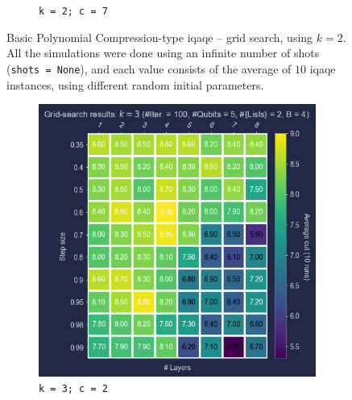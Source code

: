 \begin{figure}[ht!]
\begin{subfigure}[b]{0.325\textwidth}
      \caption{\texttt{k = 2; c = 7}}
      \label{fig:k=2;c=7}
  \end{subfigure}
  \caption{Basic Polynomial Compression-type \acrshort{iqaqe} – grid search, using $k=2$. All the simulations were done using an infinite number of shots (\texttt{shots = None}), and each value consists of the average of $10$ \acrshort{iqaqe} instances, using different random initial parameters.}
  \label{fig:k=2}
\end{figure}

\begin{figure}[ht!]
  \centering
  \begin{subfigure}[b]{0.475\textwidth}
      \centering
      \includegraphics[width=1\textwidth]{Figures/Chapter_5/k=3(Grid_search)/iQAQE_k3_Grid_Search_step_size_n_layers_c=2.png}
      \caption{\texttt{k = 3; c = 2}}
      \label{fig:k=3;c=2}
  \end{subfigure}
  \hfill
  \begin{subfigure}[b]{0.475\textwidth}
      \centering

\end{subfigure}
\end{figure}
